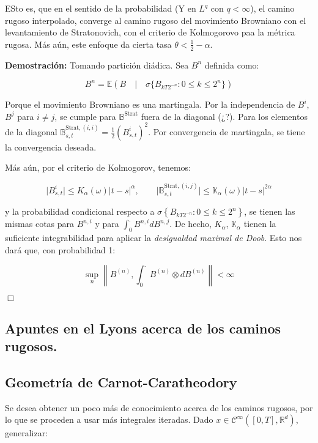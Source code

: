 ESto es, que en el sentido de la probabilidad (Y en $L^q$ con $q < \infty$), el camino rugoso interpolado, converge al camino rugoso del movimiento Browniano con el levantamiento de Stratonovich, con el criterio de Kolmogorovo paa la métrica rugosa. Más aún, este enfoque da cierta tasa $\theta < \frac{1}{2} - \alpha$. 
 

\textbf{Demostración:} Tomando partición diádica. Sea $B^n$ definida como:

\[
	B^n = \mathbb{E}(B \quad \vert \quad \sigma\{ B_{kT 2^{-n}}  : 0 \leq k \leq 2^n  \})
\]

Porque el movimiento Browniano es una martingala. Por la independencia de $B^i$, $B^j$ para $i \neq j$, se cumple para $\mathbb{B}^{\text{Strat}}$ fuera de la diagonal (¿?). Para los elementos de la diagonal $\mathbb{B}^{\text{Strat}, (i,i)}_{s,t} = \frac{1}{2} (B_{s,t}^i)^2$. Por convergencia de martingala, se tiene la convergencia deseada.

Más aún, por el criterio de Kolmogorov, tenemos:

\[
	\lvert B^i_{s,t} \rvert \leq K_{\alpha} (\omega) \lvert t - s \rvert^{\alpha}, \qquad \lvert \mathbb{B}_{s,t}^{\text{Strat}, (i,j)} \rvert \leq \mathbb{K}_{\alpha} (\omega) \lvert t - s \rvert^{2\alpha}
\]

y la probabilidad condicional respecto a $\sigma \left\{ B_{kT2^{-n}} : 0 \leq k \leq 2^n \right\}$, se tienen las mismas cotas para $B^{n,i}$ y para $\int_0^{.} B^{n,i} dB^{n,j}$. De hecho, $K_{\alpha}$, $\mathbb{K}_{\alpha}$ tienen la suficiente integrabilidad para aplicar la \textit{desigualdad maximal de Doob}. Esto nos dará que, con probabilidad 1:

\[
	\sup_n \left\lVert B^{(n)}, \int_0^{.} B^{(n)} \otimes dB^{(n)} \right\rVert < \infty
\]

\begin{flushright}
	$\Box$
\end{flushright}


\subsection{Apuntes en el Lyons acerca de los caminos rugosos.}


\subsection{Geometría de Carnot-Caratheodory}

Se desea obtener un poco más de conocimiento acerca de los caminos rugosos, por lo que se proceden a usar más integrales iteradas. Dado $x \in \mathcal{C}^{\infty} ([0,T], \mathbb{R}^d)$, generalizar:

